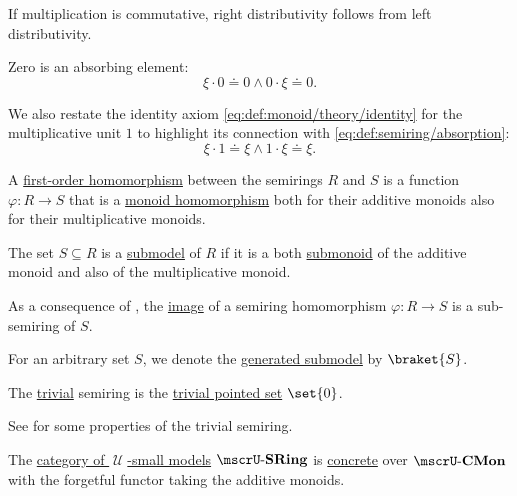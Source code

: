 \begin{definition}
\begin{thmenum}
\begin{thmenum}
      If multiplication is commutative, right distributivity follows from left distributivity.

       Zero is an absorbing element:
      \begin{equation}\label{eq:def:semiring/absorption}
        \xi \cdot 0 \doteq 0 \wedge 0 \cdot \xi \doteq 0.
      \end{equation}

       We also restate the identity axiom \eqref{eq:def:monoid/theory/identity} for the multiplicative unit \( 1 \) to highlight its connection with \eqref{eq:def:semiring/absorption}:
      \begin{equation}\label{eq:def:semiring/identity}
        \xi \cdot 1 \doteq \xi \wedge 1 \cdot \xi \doteq \xi.
      \end{equation}
    \end{thmenum}

     A \hyperref[def:first_order_homomorphism]{first-order homomorphism} between the semirings \( R \) and \( S \) is a function \( \varphi: R \to S \) that is a \hyperref[def:monoid/homomorphism]{monoid homomorphism} both for their additive monoids also for their multiplicative monoids.

     The set \( S \subseteq R \) is a \hyperref[thm:substructure_is_model]{submodel} of \( R \) if it is a both \hyperref[def:monoid/submodel]{submonoid} of the additive monoid and also of the multiplicative monoid.

    As a consequence of , the \hyperref[def:multi_valued_function/image]{image} of a semiring homomorphism \( \varphi: R \to S \) is a sub-semiring of \( S \).

    For an arbitrary set \( S \), we denote the \hyperref[def:first_order_generated_substructure]{generated submodel} by \( \braket{ S } \).

     The \hyperref[thm:substructures_form_complete_lattice/bottom]{trivial} semiring is the \hyperref[def:pointed_set/trivial]{trivial pointed set} \( \set{ 0 } \).

    See  for some properties of the trivial semiring.

     The \hyperref[def:category_of_small_first_order_models]{category of \( \mscrU \)-small models} \( \ucat{SRing} \) is \hyperref[def:concrete_category]{concrete} over \hyperref[def:monoid]{\( \ucat{CMon} \)} with the forgetful functor taking the additive monoids.


\end{thmenum}
\end{definition}
